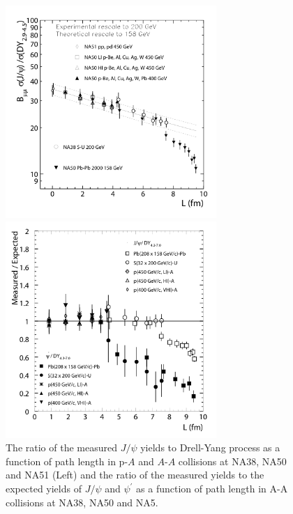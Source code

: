 \begin{figure}[!h]
  \begin{minipage}{0.5\hsize}
    \begin{center}
      \includegraphics[width=8cm]{chap2/figure/experimentaldata/sps_cnm.png}
    \end{center}
  \end{minipage}
  \begin{minipage}{0.5\hsize}
    \begin{center}
      \includegraphics[width=8cm]{chap2/figure/experimentaldata/Jpsi_SPS_HIC.png}
    \end{center}
  \end{minipage}
  \caption{
	The ratio of the measured $J/\psi$ yields to Drell-Yang process  as a function of path length in p-$A$ and $A$-$A$ collisions at NA38, NA50 and NA51 (Left)  and the ratio of the measured yields to the expected yields of $J/\psi$ and $\psi^{'}$ as a function of path length in A-A collisions at NA38, NA50 and NA5\cite{bib_2_na50aa6,bib_2_na50aa7}.
	}
  \label{fig_2_ratiodrell}
\end{figure}

